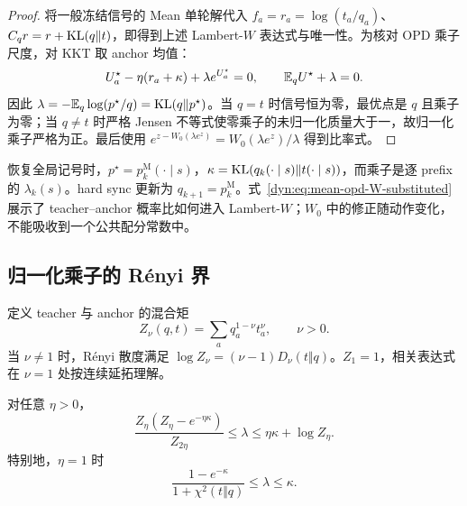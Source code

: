 \begin{proof}
将一般冻结信号的 Mean 单轮解代入 $f_a=r_a=\log(t_a/q_a)$、$C_qr=r+\operatorname{KL}(q\Vert t)$，即得到上述 Lambert-$W$ 表达式与唯一性。为核对 OPD 乘子尺度，对 KKT 取 anchor 均值：
\begin{equation*}
U_a^\star-\eta(r_a+\kappa)+\lambda e^{U_a^\star}=0,
\qquad \mathbb E_qU^\star+\lambda=0.
\end{equation*}
因此 $\lambda=-\mathbb E_q\log(p^\star/q)=\operatorname{KL}(q\Vert p^\star)$。当 $q=t$ 时信号恒为零，最优点是 $q$ 且乘子为零；当 $q\ne t$ 时严格 Jensen 不等式使零乘子的未归一化质量大于一，故归一化乘子严格为正。最后使用 $e^{z-W_0(\lambda e^z)}=W_0(\lambda e^z)/\lambda$ 得到比率式。
\end{proof}

恢复全局记号时，$p^\star=p_k^{\mathrm M}(\cdot\mid s)$，$\kappa=\operatorname{KL}(q_k(\cdot\mid s)\Vert t(\cdot\mid s))$，而乘子是逐 prefix 的 $\lambda_k(s)$。hard sync 更新为 $q_{k+1}=p_k^{\mathrm M}$。式~\eqref{dyn:eq:mean-opd-W-substituted} 展示了 teacher--anchor 概率比如何进入 Lambert-$W$；$W_0$ 中的修正随动作变化，不能吸收到一个公共配分常数中。

\subsection{归一化乘子的 R\'enyi 界}

定义 teacher 与 anchor 的混合矩
\begin{equation}
 Z_\nu(q,t)=\sum_a q_a^{1-\nu}t_a^\nu,
 \qquad \nu>0.
 \label{dyn:eq:mean-opd-renyi-Z}
\end{equation}
当 $\nu\ne1$ 时，R\'enyi 散度满足 $\log Z_\nu=(\nu-1)D_\nu(t\Vert q)$。$Z_1=1$，相关表达式在 $\nu=1$ 处按连续延拓理解。

\begin{proposition}
\label{dyn:prop:mean-opd-renyi-bounds}
对任意 $\eta>0$，
\begin{equation}
 \frac{Z_\eta(Z_\eta-e^{-\eta\kappa})}{Z_{2\eta}}
 \le\lambda\le\eta\kappa+\log Z_\eta.
 \label{dyn:eq:mean-opd-renyi-bounds}
\end{equation}
特别地，$\eta=1$ 时
\begin{equation}
 \frac{1-e^{-\kappa}}{1+\chi^2(t\Vert q)}
 \le\lambda\le\kappa.
 \label{dyn:eq:mean-opd-eta-one-bounds}
\end{equation}
\end{proposition}

